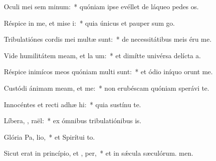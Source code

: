 \item Oculi mei sem  minum:~* quóniam ipse evéllet de láqueo pedes os.
\item Réspice in me, et mise i:~* quia únicus et pauper sum go.
\item Tribulatiónes cordis mei multæ sunt:~* de necessitátibus meis éru me.
\item Vide humilitátem meam, et la um:~* et dimítte univérsa delícta a.
\item Réspice inimícos meos quóniam multi sunt:~* et ódio iníquo orunt me.
\item Custódi ánimam meam, et  me:~* non erubéscam quóniam sperávi  te.
\item Innocéntes et recti adhæ hi:~* quia sustínu te.
\item Líbera, , raël:~* ex ómnibus tribulatiónibus is.
\item Glória Pa,  lio,~* et Spirítui to.
\item Sicut erat in princípio, et ,  per,~* et in sǽcula sæculórum. men.
